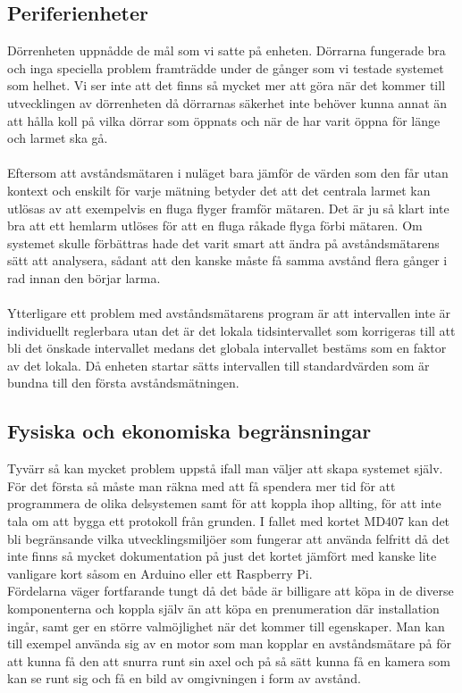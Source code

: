 \documentclass{article}
\begin{document}
\subsection{Periferienheter}
\noindent
Dörrenheten uppnådde de mål som vi satte på enheten. 
Dörrarna fungerade bra och inga speciella problem framträdde under de gånger som vi testade systemet som helhet. 
Vi ser inte att det finns så mycket mer att göra när det kommer till utvecklingen av dörrenheten då dörrarnas säkerhet inte behöver kunna annat än att hålla koll på vilka dörrar som öppnats och när de har varit öppna för länge och larmet ska gå.\\
\\
Eftersom att avståndsmätaren i nuläget bara jämför de värden som den får utan kontext och enskilt för varje mätning betyder det att det centrala larmet kan utlösas av att exempelvis en fluga flyger framför mätaren.
Det är ju så klart inte bra att ett hemlarm utlöses för att en fluga råkade flyga förbi mätaren.
Om systemet skulle förbättras hade det varit smart att ändra på avståndsmätarens sätt att analysera, sådant att den kanske måste få samma avstånd flera gånger i rad innan den börjar larma.\\
\\
Ytterligare ett problem med avståndsmätarens program är att intervallen inte är individuellt reglerbara utan det är det lokala tidsintervallet som korrigeras till att bli det önskade intervallet medans det globala intervallet bestäms som en faktor av det lokala. 
Då enheten startar sätts intervallen till standardvärden som är bundna till den första avståndsmätningen. 

\subsection{Fysiska och ekonomiska begränsningar}
\noindent
Tyvärr så kan mycket problem uppstå ifall man väljer att skapa systemet själv.
För det första så måste man räkna med att få spendera mer tid för att programmera de olika delsystemen samt för att koppla ihop allting, för att inte tala om att bygga ett protokoll från grunden.
I fallet med kortet MD407 kan det bli begränsande vilka utvecklingsmiljöer som fungerar att använda felfritt då det inte finns så mycket dokumentation på just det kortet jämfört med kanske lite vanligare kort såsom en Arduino eller ett Raspberry Pi.\\

\noindent
Fördelarna väger fortfarande tungt då det både är billigare att köpa in de diverse komponenterna och koppla själv än att köpa en prenumeration där installation ingår, samt ger en större valmöjlighet när det kommer till egenskaper. 
Man kan till exempel använda sig av en motor som man kopplar en avståndsmätare på för att kunna få den att snurra runt sin axel och på så sätt kunna få en kamera som kan se runt sig och få en bild av omgivningen i form av avstånd.\\
\end{document}
